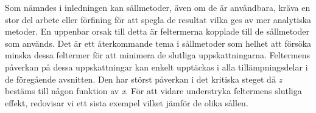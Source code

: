 

Som nämndes i inledningen kan sållmetoder, även om de är användbara, kräva en stor del arbete eller förfining för att spegla de resultat vilka ges av mer analytiska metoder. 
En uppenbar orsak till  detta är feltermerna kopplade till de sållmetoder som används. 
Det är ett återkommande tema i sållmetoder som helhet att försöka minska dessa feltermer för att minimera de slutliga uppskattningarna.
Feltermens påverkan på dessa uppskattningar kan enkelt upptäckas i alla tillämpningsdelar i de föregående avsnitten.
Den har störst påverkan i det kritiska steget då \textit{z} bestäms till någon funktion av \textit{x}.
För att vidare understryka feltermens slutliga effekt, redovisar vi ett sista exempel vilket jämför de olika sållen.


